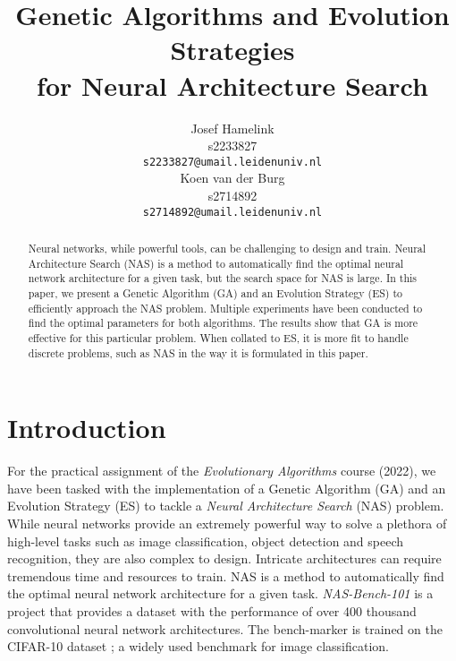 \documentclass{article}
\title{Genetic Algorithms and Evolution Strategies \\ for Neural Architecture Search}
\author{
    Josef Hamelink \\
    s2233827 \\
    \texttt{s2233827@umail.leidenuniv.nl} \\
    \And
    Koen van der Burg \\
     s2714892 \\
    \texttt{s2714892@umail.leidenuniv.nl} \\
}
\begin{document}
\maketitle



\begin{abstract}
Neural networks, while powerful tools, can be challenging to design and train. 
Neural Architecture Search (NAS) is a method to automatically find the optimal neural network architecture for a given task, but the search space for NAS is large.
In this paper, we present a Genetic Algorithm (GA) and an Evolution Strategy (ES) to efficiently approach the NAS problem.
Multiple experiments have been conducted to find the optimal parameters for both algorithms.
The results show that GA is more effective for this particular problem.
When collated to ES, it is more fit to handle discrete problems, such as NAS in the way it is formulated in this paper.
\end{abstract}



\section{Introduction}
\label{sec:intro}

For the practical assignment of the \textit{Evolutionary Algorithms} course (2022), we have been tasked with the implementation of a Genetic Algorithm (GA) and an Evolution Strategy (ES) to tackle a \textit{Neural Architecture Search} (NAS) problem.
While neural networks provide an extremely powerful way to solve a plethora of high-level tasks such as image classification, object detection and speech recognition, they are also complex to design.
Intricate architectures can require tremendous time and resources to train.
NAS is a method to automatically find the optimal neural network architecture for a given task.
\textit{NAS-Bench-101} \cite{nasbench101} is a project that provides a dataset with the performance of over 400 thousand convolutional neural network architectures. 
The bench-marker is trained on the CIFAR-10 dataset \cite{cifar10}; a widely used benchmark for image classification.
\end{document}
